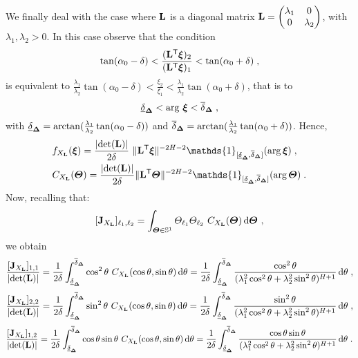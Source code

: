 \documentclass{elsarticle}
\begin{document}
 We finally deal with the case where $\mathbf{L}$ is a diagonal matrix  $\mathbf{L}=\begin{pmatrix}\lambda_1&0\\0&\lambda_2\end{pmatrix}$, with $\lambda_1,\lambda_2 > 0$. In this case observe that the condition
\[
\tan(\alpha_0-\delta)<\frac{(\mathbf{L}^{\mathsf{T}}\bm{\xi})_2}{(\mathbf{L}^{\mathsf{T}}\bm{\xi})_1}<\tan(\alpha_0+\delta)\;,
\]
is equivalent to $\frac{\lambda_1}{\lambda_2}\tan(\alpha_0-\delta)<\frac{\xi_2}{\xi_1}<\frac{\lambda_1}{\lambda_2}\tan(\alpha_0+\delta)$, that is to
\[
\underline{\delta}_{\mathbf{\Delta}}<\arg\, \bm{\xi}<\overline{\delta}_{\mathbf{\Delta}}\;,
\]
with $\underline{\delta}_{\mathbf{\Delta}}=\mathrm{arctan}(\frac{\lambda_1}{\lambda_2}\tan(\alpha_0-\delta))$ and $\overline{\delta}_{\mathbf{\Delta}}=\mathrm{arctan}(\frac{\lambda_1}{\lambda_2}\tan(\alpha_0+\delta))$. Hence,
\begin{align*}
&f_{X_{\mat{L}}}(\vect{\xi})=\frac{\lvert \mathrm{det}(\mat{L})\rvert}{2\delta}~ \lVert \mat{L}^{\T} \vect{\xi}\rVert^{-2H-2} \mathds{1}_{[\underline{\delta}_\mat{\Delta},\overline{\delta}_\mat{\Delta}]}(\arg \vect{\xi})\;,\\
&C_{X_{\mat{L}}}(\vect{\Theta})=\frac{\lvert \mathrm{det}(\mat{L})\rvert}{2\delta} \lVert \mat{L}^{\T} \vect{\Theta}\rVert^{-2H-2} \mathds{1}_{[\underline{\delta}_\mat{\Delta},\overline{\delta}_\mat{\Delta}]}(\arg \vect{\Theta})\;.
\end{align*}
%
Now, recalling that:
$$[\mat{J}_{X_{\mat{L}}}]_{\ell_1,\ell_2}=\int_{\vect{\Theta}\in\mathbb{S}^{1}} {\Theta}_{\ell_1}{\Theta}_{\ell_2}~C_{X_{\mat{L}}}(\vect{\Theta})\dif \vect{\Theta}~, $$
we obtain
\[
\frac{[\mathbf{J}_{X_{\mathbf{L}}}]_{1,1}}{\lvert \mathrm{det}(\mathbf{L})\rvert}= \frac{1}{2\delta}
\int_{\underline{\delta}_{\mathbf{\Delta}}}^{\overline{\delta}_{\mathbf{\Delta}}} \cos^2 \theta~C_{X_{\mathbf{L}}}(\cos \theta,\sin \theta)\mathop{}\mathopen{}\mathrm{d} \theta=  \frac{1}{2\delta}
\int_{\underline{\delta}_{\mathbf{\Delta}}}^{\overline{\delta}_{\mathbf{\Delta}}} \frac{\cos^2 \theta}{(\lambda_1^2 \cos^2 \theta+\lambda_2^2 \sin^2 \theta)^{H+1}}\mathop{}\mathopen{}\mathrm{d} \theta\;,
\]
\[
\frac{[\mathbf{J}_{X_{\mathbf{L}}}]_{2,2}}{\lvert \mathrm{det}(\mathbf{L})\rvert}= 
 \frac{1}{2\delta} \int_{\underline{\delta}_{\mathbf{\Delta}}}^{\overline{\delta}_{\mathbf{\Delta}}}\sin^2 \theta~ C_{X_{\mathbf{L}}}(\cos \theta,\sin \theta)\mathop{}\mathopen{}\mathrm{d} \theta= \frac{1}{2\delta}
 \int_{\underline{\delta}_{\mathbf{\Delta}}}^{\overline{\delta}_{\mathbf{\Delta}}} \frac{\sin^2 \theta}{(\lambda_1^2 \cos^2 \theta+\lambda_2^2 \sin^2 \theta)^{H+1}}\mathop{}\mathopen{}\mathrm{d} \theta\;,
\]
\[
\frac{[\mathbf{J}_{X_{\mathbf{L}}}]_{1,2}}{\lvert \mathrm{det}(\mathbf{L})\rvert}= \frac{1}{2\delta}
\int_{\underline{\delta}_{\mathbf{\Delta}}}^{\overline{\delta}_{\mathbf{\Delta}}} \cos \theta\sin \theta~C_{X_{\mathbf{L}}}(\cos \theta,\sin \theta)\mathop{}\mathopen{}\mathrm{d} \theta=  \frac{1}{2\delta}\int_{\underline{\delta}_{\mathbf{\Delta}}}^{\overline{\delta}_{\mathbf{\Delta}}} \frac{\cos\theta\sin \theta}{(\lambda_1^2 \cos^2 \theta+\lambda_2^2 \sin^2 \theta)^{H+1}}\mathop{}\mathopen{}\mathrm{d} \theta\;.
\]
\end{document}
